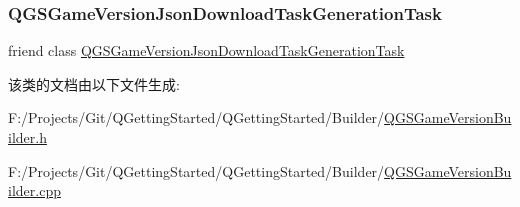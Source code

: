 \subsubsection{\texorpdfstring{Q\+G\+S\+Game\+Version\+Json\+Download\+Task\+Generation\+Task}{QGSGameVersionJsonDownloadTaskGenerationTask}}
{\footnotesize\ttfamily friend class \mbox{\hyperlink{class_q_g_s_game_version_json_download_task_generation_task}{Q\+G\+S\+Game\+Version\+Json\+Download\+Task\+Generation\+Task}}\hspace{0.3cm}{\ttfamily [friend]}}



该类的文档由以下文件生成\+:\begin{DoxyCompactItemize}
\item 
F\+:/\+Projects/\+Git/\+Q\+Getting\+Started/\+Q\+Getting\+Started/\+Builder/\mbox{\hyperlink{_q_g_s_game_version_builder_8h}{Q\+G\+S\+Game\+Version\+Builder.\+h}}\item 
F\+:/\+Projects/\+Git/\+Q\+Getting\+Started/\+Q\+Getting\+Started/\+Builder/\mbox{\hyperlink{_q_g_s_game_version_builder_8cpp}{Q\+G\+S\+Game\+Version\+Builder.\+cpp}}\end{DoxyCompactItemize}
